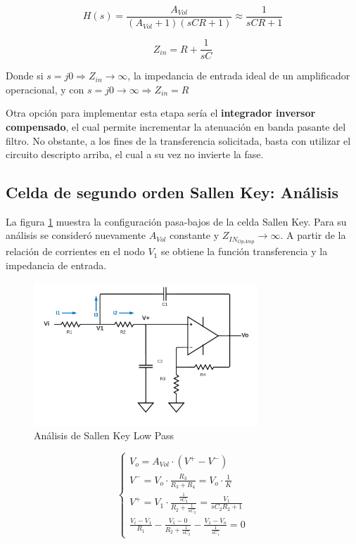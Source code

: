 \begin{equation}
        H(s) = \frac{A_{Vol}}{(A_{Vol}+1)(sCR + 1)} \approx \frac{1}{sCR + 1}
    \label{eq:SK6}
\end{equation}

\begin{equation}
        Z_{in} = R + \frac{1}{sC} 
    \label{eq:SK7}
\end{equation}

Donde si $s = j0 \Rightarrow Z_{in} \rightarrow  \infty$, la impedancia de entrada ideal de un amplificador operacional, y con $s = j0 \rightarrow \infty \Rightarrow Z_{in} = R$

Otra opción para implementar esta etapa sería el \textbf{integrador inversor compensado}, el cual permite incrementar la atenuación en banda pasante del filtro. No obstante, a los fines de la transferencia solicitada, basta con utilizar el circuito descripto arriba, el cual a su vez no invierte la fase. 

\subsection{Celda de segundo orden Sallen Key: Análisis}

La figura \ref{fig:SK_H} muestra la configuración pasa-bajos de la celda Sallen Key. Para su análisis se consideró nuevamente $A_{Vol}$ constante y $Z_{IN_{OpAmp}}\rightarrow \infty$. A partir de la relación de corrientes en el nodo $V_{1}$ se obtiene la función transferencia y la impedancia de entrada.

\begin{figure}[H]
    \centering
    \includegraphics[width= 0.75\textwidth]{../Ejercicio2-DisenoDeCeldas/1CeldaSallenKey/images/SallenKeyH.png}
    \caption{Análisis de Sallen Key Low Pass}
    \label{fig:SK_H}
\end{figure}

\begin{equation}
\left\{\begin{matrix}
       V_{o} = A_{Vol} \cdot (V^{+}-V^{-})
        \\
        V^{-} = V_{o} \cdot \frac{R_{3}}{R_{3}+R_{4}} = V_{o} \cdot \frac{1}{K}
        \\
        V^{+} = V_{1} \cdot \frac{\frac{1}{sC_{2}}}{R_{2}+\frac{1}{sC_{2}}} = \frac{V_{1}}{sC_{2}R_{2} + 1}
        \\
        \frac{V_{i}-V_{1}}{R_{1}} - \frac{V_{1}-0}{R_{2}+\frac{1}{sC_{2}}} - \frac{V_{1}-V_{o}}{\frac{1}{sC_{1}}} = 0
\end{matrix}\right.
    \label{eq:SK8}
\end{equation}

